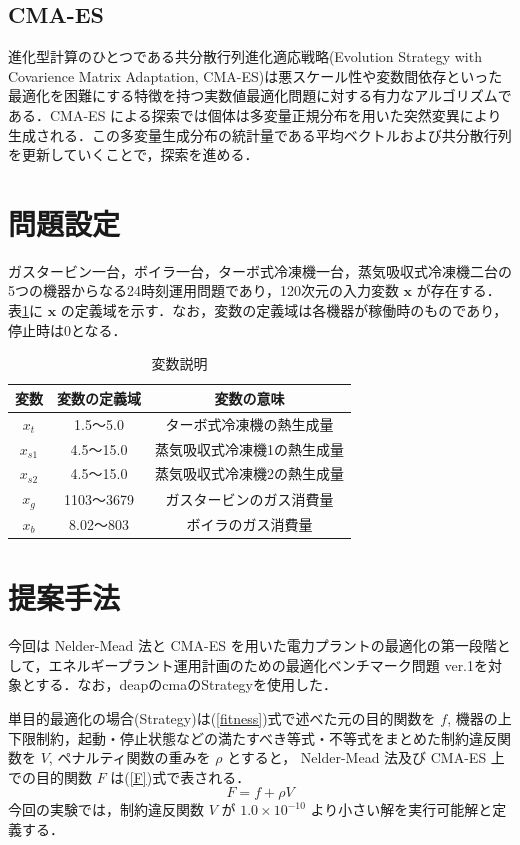 \documentclass[twocolumn]{jarticle}
\begin{document}
    \subsection{CMA-ES}
    進化型計算のひとつである共分散行列進化適応戦略(Evolution Strategy with Covarience Matrix Adaptation, CMA-ES)\cite{542381}は悪スケール性や変数間依存といった最適化を困難にする特徴を持つ実数値最適化問題に対する有力なアルゴリズムである\cite{akimoto2016}．CMA-ES による探索では個体は多変量正規分布を用いた突然変異により生成される．この多変量生成分布の統計量である平均ベクトルおよび共分散行列を更新していくことで，探索を進める．

\section{問題設定}
ガスタービン一台，ボイラ一台，ターボ式冷凍機一台，蒸気吸収式冷凍機二台の5つの機器からなる24時刻運用問題であり，120次元の入力変数 $\bm{x}$ が存在する．表\ref{explain_variables}に $\bm{x}$ の定義域を示す．なお，変数の定義域は各機器が稼働時のものであり，停止時は0となる．
\begin{table}[hbtp]
    \caption{変数説明}
    \label{explain_variables}
    \centering
    \begin{tabular}{|c|c|c|}
        \hline
        変数 & 変数の定義域 & 変数の意味 \\
        \hline
        $x_t$ & 1.5〜5.0 & ターボ式冷凍機の熱生成量 \\
        $x_{s1}$ & 4.5〜15.0 & 蒸気吸収式冷凍機1の熱生成量 \\
        $x_{s2}$ & 4.5〜15.0 & 蒸気吸収式冷凍機2の熱生成量 \\
        $x_g$ & 1103〜3679 & ガスタービンのガス消費量 \\
        $x_b$ & 8.02〜803 & ボイラのガス消費量 \\
        \hline
    \end{tabular}
  \end{table}
  
\section{提案手法}
今回は Nelder-Mead 法と CMA-ES を用いた電力プラントの最適化の第一段階として，エネルギープラント運用計画のための最適化ベンチマーク問題 ver.1\cite{denki}を対象とする．なお，deapのcmaのStrategyを使用した\cite{DEAP_JMLR2012}．

単目的最適化の場合(Strategy)は(\ref{fitness})式で述べた元の目的関数を $f$, 機器の上下限制約，起動・停止状態などの満たすべき等式・不等式をまとめた制約違反関数を $V$, ペナルティ関数の重みを $\rho$ とすると， Nelder-Mead 法及び CMA-ES 上での目的関数 $F$ は(\ref{F})式で表される．
\begin{equation}
    \label{F}
    F = f + \rho V
\end{equation}
今回の実験では，制約違反関数 $V$ が $1.0 \times 10^{-10}$ より小さい解を実行可能解と定義する．
\end{document}
